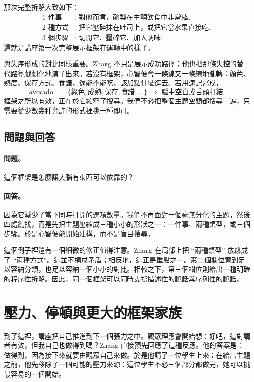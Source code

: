 那次完整拆解大致如下：
\begin{align}
\text{1 件事} &:\ \text{對他而言，酪梨在生酮飲食中非常棒},\\
\text{2 種方式} &:\ \text{把它壓碎抹在吐司上，或把它當水果直接吃},\\
\text{3 個步驟} &:\ \text{切開它、壓碎它、加入調味}.
\end{align}
這就是講座第一次完整展示框架在運轉中的樣子。

與失序形成的對比同樣重要。Zhang 不只是展示成功路徑；他也把那條失控的替代路徑戲劇化地演了出來。若沒有框架，心智便會一條線又一條線地亂轉：顏色、熟度、保存方式、食譜、還能不能吃、該加點什麼進去。若用速記寫成，
\begin{equation}
\text{avocado}
\;\Rightarrow\;
\{\text{綠色},\text{成熟},\text{保存},\text{食譜},\ldots\}
\;\Rightarrow\;
\text{腦中空白或舌頭打結}.
\end{equation}
框架之所以有效，正在於它縮窄了搜尋。我們不必把整個主題空間都搜尋一遍，只需要從少數幾種允許的形式裡挑一種即可。

\subsection{問題與回答}

\paragraph{問題。} 這個框架是怎麼讓大腦有東西可以依靠的？

\paragraph{回答。} 因為它減少了當下同時打開的選項數量。我們不再面對一個毫無分化的主題，然後四處亂找，而是先把主題壓縮成三種小小的形狀之一：一件事、兩種類型，或三個步驟。於是心智便能開始建構，而不是盲目搜尋。

這個例子裡還有一個細微的修正值得注意。Zhang 在局部上把 ``兩種類型'' 放鬆成了 ``兩種方式''。這並不構成矛盾；相反地，這正是重點之一。第二個欄位寬到足以容納分類，也足以容納一個小小的對比。相較之下，第三個欄位則給出一種明確的程序性拆解。因此，同一個框架可以同時支撐描述性的說話與序列性的說話。

\section{壓力、停頓與更大的框架家族}

到了這裡，講座把自己推進到下一個張力之中。觀眾理應會開始想：好吧，這對講者有效，但我自己也做得到嗎？Zhang 直接預先回應了這種反應。他的答案是：做得到，因為接下來就要由觀眾自己來做。於是他請了一位學生上來；在給出主題之前，他先移除了一個可能的壓力來源：這位學生不必三個部分都做完，她可以挑最容易的一個開始。

